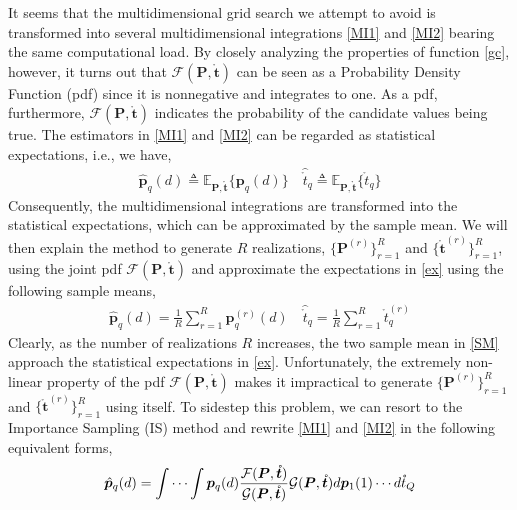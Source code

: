 \documentclass[review]{elsarticle}
\begin{document}
It seems that the multidimensional grid search we attempt to avoid is transformed into several multidimensional integrations \eqref{MI1} and \eqref{MI2} bearing the same computational load. By closely analyzing the properties of function \eqref{gc}, however, it turns out that $\mathcal{F}(\boldsymbol{P},\mathring{\boldsymbol{t}})$ can be seen as a Probability Density Function (pdf) since it is nonnegative and integrates to one. As a pdf, furthermore, $\mathcal{F}(\boldsymbol{P},\mathring{\boldsymbol{t}})$ indicates the probability of the candidate values being true. The estimators in \eqref{MI1} and \eqref{MI2} can be regarded as statistical expectations, i.e., we have,
\begin{align}\label{ex}
    \hat{\boldsymbol{p}}_q(d)\triangleq \mathbb{E}_{\boldsymbol{P},\mathring{\boldsymbol{t}}}\{\boldsymbol{p}_q(d)\} \quad \hat{\mathring{t}}_q\triangleq \mathbb{E}_{\boldsymbol{P},\mathring{\boldsymbol{t}}}\{\mathring{t}_q\}
\end{align}
Consequently, the multidimensional integrations are transformed into the statistical expectations, which can be approximated by the sample mean. 
We will then explain the method to generate $R$ realizations, $\lbrace \boldsymbol{P}^{(r)}\rbrace_{r=1}^R$ and $\lbrace \mathring{\boldsymbol{t}}^{(r)}\rbrace_{r=1}^R$, using the joint pdf $\mathcal{F}(\boldsymbol{P},\mathring{\boldsymbol{t}})$ and approximate the expectations in \eqref{ex} using the following sample means,
\begin{align}\label{SM}
    \hat{\boldsymbol{p}}_q(d)=\frac{1}{R}\sum_{r=1}^R \boldsymbol{p}_q^{(r)}(d) \quad \hat{\mathring{t}}_q=\frac{1}{R}\sum_{r=1}^R \mathring{t}_q^{(r)}
\end{align}
Clearly, as the number of realizations $R$ increases, the two sample mean in \eqref{SM} approach the statistical expectations in \eqref{ex}. Unfortunately, the extremely non-linear property of the pdf $\mathcal{F}(\boldsymbol{P},\mathring{\boldsymbol{t}})$ makes it impractical to generate $\lbrace \boldsymbol{P}^{(r)}\rbrace_{r=1}^R$ and $\lbrace \mathring{\boldsymbol{t}}^{(r)}\rbrace_{r=1}^R$ using itself. To sidestep this problem, we can resort to the Importance Sampling (IS) method \cite{ISdoa2008,Kay2000Mean} and rewrite \eqref{MI1} and \eqref{MI2} in the following equivalent forms,
\begin{align}\label{IS-P}
    \hat{\boldsymbol{p}}_q(d)=\idotsint \boldsymbol{p}_q(d) \frac{\mathcal{F}(\boldsymbol{P},\mathring{\boldsymbol{t}})}{\mathcal{G}(\boldsymbol{P},\mathring{\boldsymbol{t}})}\mathcal{G}(\boldsymbol{P},\mathring{\boldsymbol{t}})d\boldsymbol{p}_1(1) \cdots d\mathring{t}_Q
\end{align}
\end{document}
